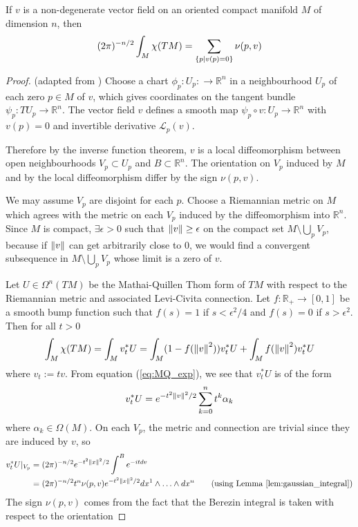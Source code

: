 \begin{thm} %
	If $v$ is a non-degenerate vector field on an oriented compact manifold $M$ 
	of dimension $n$, then 
	\[
		 (2\pi)^{-n /2} \int_M \chi(TM) = \sum_{\set{p|v(p)=0}} \nu(p,v)	
	\] 
\end{thm}
\begin{proof}
	(adapted from \cite[Theorem 1.56]{bgv})
	Choose a chart $\phi_p : U_p : \to \mathbb{R}^n$ in a neighbourhood $U_p$ of
	each zero $p\in M$ of $v$, which gives coordinates on the tangent bundle 
	$\psi_p : TU_p \to \mathbb{R}^n$. The vector field $v$ defines a
	smooth map $\psi_p \circ v : U_p\to \mathbb{R}^n$ 
	with $v(p) = 0$ and invertible
	derivative $\mathcal{L}_p(v)$. 

	Therefore by the inverse function theorem, $v$ is a local diffeomorphism
	between open neighbourhoods $V_p \subset U_p$ and $B \subset \mathbb{R}^n$. 
	The orientation on $V_p$ induced by  $M$ and by the local diffeomorphism
	differ by the sign $\nu(p,v)$. 

	We may assume  $V_p$ are disjoint for each $p$.  Choose a Riemannian metric
	on $M$ which agrees with the metric on each $V_p$ induced by the diffeomorphism
	into  $\mathbb{R}^n$. Since $M$ is compact,  $\exists \epsilon > 0$ such
	that  $\norm{v} \geq \epsilon$ on the compact set  $M\setminus \bigcup_p V_p$,
	because if $\norm{v}$ can get arbitrarily close to 0, we would find a convergent
	subsequence in $M\setminus \bigcup_p V_p$ whose limit is a zero of $v$.  

	Let $U\in \Omega^n(TM)$ be the Mathai-Quillen Thom form of  $TM$ with respect to the
	Riemannian metric and associated Levi-Civita connection. 
	Let $f : \mathbb{R}_+ \to [0,1]$ be a smooth bump function such that $f(s)=1$
	if  $s < \epsilon^2 /4$ and $f(s)=0$ if  $s>\epsilon^2$. Then for all $t>0$
	\[
		\int_M \chi(TM) = \int_M v_t^* U 
		= \int_M (1-f(\norm{v}^2))v_t^*U  + \int_M f(\norm{v}^2)v_t^*U
	\] 
	where $v_t := tv$. From equation (\ref{eq:MQ_exp}), we see that
	$v_t^* U$ is of the form
	\[
		v_t^*U = e^{-t^2\norm{v}^2 /2} \sum_{k=0}^{n} t^k \alpha_k
	\] 
	where $\alpha_k \in \Omega(M)$.
	On each $V_p$, the metric and connection are trivial since they are induced 
	by $v$, so 
	\begin{align*}
		v_t^*U |_{V_p} 
		&= (2\pi)^{-n/2} e^{-t^2\norm{x}^2 /2} \int^B e^{-itdv} \\
		&= (2\pi)^{-n/2}t^n \nu(p,v) e^{-t^2\norm{x}^2 /2} dx^1 \wedge
		\ldots\wedge dx^n \tag{using Lemma \ref{lem:gaussian_integral}}
	\end{align*}
	The sign $\nu(p,v)$ comes from the fact that the Berezin integral is taken
	with respect to the orientation 
	 
\end{proof}


